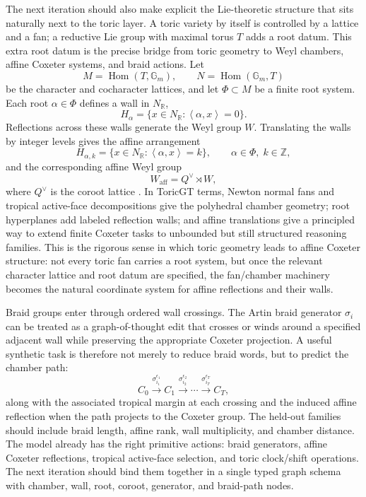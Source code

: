 \documentclass[11pt]{article}
\theoremstyle{definition}
\theoremstyle{plain}
\theoremstyle{remark}
\numberwithin{equation}{section}
\newcommand{\R}{\mathbb{R}}
\newcommand{\Z}{\mathbb{Z}}
\newcommand{\ip}[2]{\left\langle #1,#2\right\rangle}
\begin{document}
The next iteration should also make explicit the Lie-theoretic structure that sits naturally next to the toric layer.  A toric variety by itself is controlled by a lattice and a fan; a reductive Lie group with maximal torus $T$ adds a root datum.  This extra root datum is the precise bridge from toric geometry to Weyl chambers, affine Coxeter systems, and braid actions.  Let
\begin{equation}
  M=\operatorname{Hom}(T,\mathbb G_m),\qquad
  N=\operatorname{Hom}(\mathbb G_m,T)
\end{equation}
be the character and cocharacter lattices, and let $\Phi\subset M$ be a finite root system.  Each root $\alpha\in\Phi$ defines a wall in $N_\R$,
\begin{equation}
  H_\alpha=\{x\in N_\R:\ip{\alpha}{x}=0\}.
\end{equation}
Reflections across these walls generate the Weyl group $W$.  Translating the walls by integer levels gives the affine arrangement
\begin{equation}
  H_{\alpha,k}=\{x\in N_\R:\ip{\alpha}{x}=k\},\qquad \alpha\in\Phi,\;k\in\Z,
\end{equation}
and the corresponding affine Weyl group
\begin{equation}
  W_{\mathrm{aff}}=Q^\vee\rtimes W,
\end{equation}
where $Q^\vee$ is the coroot lattice \cite{humphreys1990reflection}.  In ToricGT terms, Newton normal fans and tropical active-face decompositions give the polyhedral chamber geometry; root hyperplanes add labeled reflection walls; and affine translations give a principled way to extend finite Coxeter tasks to unbounded but still structured reasoning families.  This is the rigorous sense in which toric geometry leads to affine Coxeter structure: not every toric fan carries a root system, but once the relevant character lattice and root datum are specified, the fan/chamber machinery becomes the natural coordinate system for affine reflections and their walls.

Braid groups enter through ordered wall crossings.  The Artin braid generator $\sigma_i$ can be treated as a graph-of-thought edit that crosses or winds around a specified adjacent wall while preserving the appropriate Coxeter projection.  A useful synthetic task is therefore not merely to reduce braid words, but to predict the chamber path:
\begin{equation}
  C_0 \xrightarrow{\sigma_{i_1}^{\epsilon_1}} C_1
  \xrightarrow{\sigma_{i_2}^{\epsilon_2}}\cdots
  \xrightarrow{\sigma_{i_T}^{\epsilon_T}} C_T,
\end{equation}
along with the associated tropical margin at each crossing and the induced affine reflection when the path projects to the Coxeter group.  The held-out families should include braid length, affine rank, wall multiplicity, and chamber distance.  The model already has the right primitive actions: braid generators, affine Coxeter reflections, tropical active-face selection, and toric clock/shift operations.  The next iteration should bind them together in a single typed graph schema with chamber, wall, root, coroot, generator, and braid-path nodes.
\end{document}

